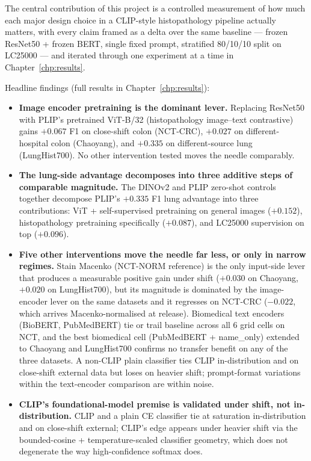The central contribution of this project is a controlled measurement of how much each major design choice in a CLIP-style histopathology pipeline actually matters, with every claim framed as a delta over the same baseline --- frozen ResNet50 + frozen BERT, single fixed prompt, stratified 80/10/10 split on LC25000 --- and iterated through one experiment at a time in Chapter~\ref{chp:results}.

Headline findings (full results in Chapter~\ref{chp:results}):
\begin{itemize}
    \item \textbf{Image encoder pretraining is the dominant lever.} Replacing ResNet50 with PLIP's pretrained ViT-B/32 (histopathology image--text contrastive) gains $+0.067$ F1 on close-shift colon (NCT-CRC), $+0.027$ on different-hospital colon (Chaoyang), and $+0.335$ on different-source lung (LungHist700). No other intervention tested moves the needle comparably.
    \item \textbf{The lung-side advantage decomposes into three additive steps of comparable magnitude.} The DINOv2 and PLIP zero-shot controls together decompose PLIP's $+0.335$ F1 lung advantage into three contributions: ViT + self-supervised pretraining on general images ($+0.152$), histopathology pretraining specifically ($+0.087$), and LC25000 supervision on top ($+0.096$).
    \item \textbf{Five other interventions move the needle far less, or only in narrow regimes.} Stain Macenko (NCT-NORM reference) is the only input-side lever that produces a measurable positive gain under shift ($+0.030$ on Chaoyang, $+0.020$ on LungHist700), but its magnitude is dominated by the image-encoder lever on the same datasets and it regresses on NCT-CRC ($-0.022$, which arrives Macenko-normalised at release). Biomedical text encoders (BioBERT, PubMedBERT) tie or trail baseline across all 6 grid cells on NCT, and the best biomedical cell (PubMedBERT + name\_only) extended to Chaoyang and LungHist700 confirms no transfer benefit on any of the three datasets. A non-CLIP plain classifier ties CLIP in-distribution and on close-shift external data but loses on heavier shift; prompt-format variations within the text-encoder comparison are within noise.
    \item \textbf{CLIP's foundational-model premise is validated under shift, not in-distribution.} CLIP and a plain CE classifier tie at saturation in-distribution and on close-shift external; CLIP's edge appears under heavier shift via the bounded-cosine + temperature-scaled classifier geometry, which does not degenerate the way high-confidence softmax does.
\end{itemize}

